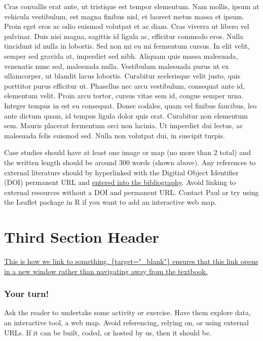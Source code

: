 \documentclass[
]{book}
\begin{document}
Cras convallis erat ante, ut tristique est tempor elementum. Nam mollis, ipsum at vehicula vestibulum, est magna finibus nisl, et laoreet metus massa et ipsum. Proin eget eros ac odio euismod volutpat et ac diam. Cras viverra ut libero vel pulvinar. Duis nisi magna, sagittis id ligula ac, efficitur commodo eros. Nulla tincidunt id nulla in lobortis. Sed non mi eu mi fermentum cursus. In elit velit, semper sed gravida at, imperdiet sed nibh. Aliquam quis massa malesuada, venenatis nunc sed, malesuada nulla. Vestibulum malesuada purus ut ex ullamcorper, ut blandit lacus lobortis. Curabitur scelerisque velit justo, quis porttitor purus efficitur ut. Phasellus nec arcu vestibulum, consequat ante id, elementum velit. Proin arcu tortor, cursus vitae sem id, congue semper urna. Integer tempus in est eu consequat. Donec sodales, quam vel finibus faucibus, leo ante dictum quam, id tempus ligula dolor quis erat. Curabitur non elementum sem. Mauris placerat fermentum orci non lacinia. Ut imperdiet dui lectus, ac malesuada felis euismod sed. Nulla non volutpat dui, in suscipit turpis.

Case studies should have at least one image or map (no more than 2 total) and the written length should be around 300 words (shown above). Any references to external literature should by hyperlinked with the Digitial Object Identifier (DOI) permanent URL and \href{https://bookdown.org/yihui/bookdown/citations.html}{entered into the bibliography}. Avoid linking to external resources without a DOI and permanent URL. Contact Paul or try using the Leaflet package in R if you want to add an interactive web map.

\hypertarget{third-section-header-1}{%
\section{Third Section Header}\label{third-section-header-1}}

\href{https://google.com}{This is how we link to something. \{target="\_blank"\} ensures that this link opens in a new window rather than navigating away from the textbook.}

\hypertarget{your-turn-3}{%
\subsubsection*{Your turn!}\label{your-turn-3}}

Ask the reader to undertake some activity or exercise. Have them explore data, an interactive tool, a web map. Avoid referencing, relying on, or using external URLs. If it can be built, coded, or hosted by us, then it should be.
\end{document}
